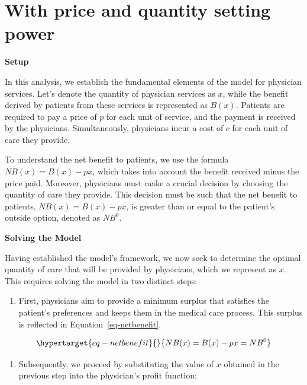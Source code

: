 \documentclass[
  letterpaper,
  DIV=11,
  numbers=noendperiod]{scrreport}
\providecommand{\tightlist}{%
  \setlength{\itemsep}{0pt}\setlength{\parskip}{0pt}}\usepackage{longtable,booktabs,array}
\theoremstyle{definition}
\theoremstyle{remark}
\begin{document}
\hypertarget{with-price-and-quantity-setting-power}{%
\section{With price and quantity setting
power}\label{with-price-and-quantity-setting-power}}

\textbf{Setup}

In this analysis, we establish the fundamental elements of the model for
physician services. Let's denote the quantity of physician services as
\(x\), while the benefit derived by patients from these services is
represented as \(B(x)\). Patients are required to pay a price of \(p\)
for each unit of service, and the payment is received by the physicians.
Simultaneously, physicians incur a cost of \(c\) for each unit of care
they provide.

To understand the net benefit to patients, we use the formula
\(NB(x) = B(x) - px\), which takes into account the benefit received
minus the price paid. Moreover, physicians must make a crucial decision
by choosing the quantity of care they provide. This decision must be
such that the net benefit to patients, \(NB(x) = B(x) - px\), is greater
than or equal to the patient's outside option, denoted as \(NB^{0}\).

\textbf{Solving the Model}

Having established the model's framework, we now seek to determine the
optimal quantity of care that will be provided by physicians, which we
represent as \(x\). This requires solving the model in two distinct
steps:

\begin{enumerate}
\def\labelenumi{\arabic{enumi}.}
\tightlist
\item
  First, physicians aim to provide a minimum surplus that satisfies the
  patient's preferences and keeps them in the medical care process. This
  surplus is reflected in Equation~\ref{eq-netbenefit}.
\end{enumerate}

\begin{equation}\protect\hypertarget{eq-netbenefit}{}{NB(x) = B(x) - px = NB^{0}}\label{eq-netbenefit}\end{equation}

\begin{enumerate}
\def\labelenumi{\arabic{enumi}.}
\setcounter{enumi}{1}
\tightlist
\item
  Subsequently, we proceed by substituting the value of \(x\) obtained
  in the previous step into the physician's profit function:
\end{enumerate}
\end{document}

